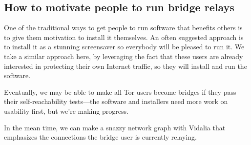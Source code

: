 \documentclass{llncs}
\begin{document}
\subsection{How to motivate people to run bridge relays}
\label{subsec:incentives}

One of the traditional ways to get people to run software that benefits
others is to give them motivation to install it themselves.  An often
suggested approach is to install it as a stunning screensaver so everybody
will be pleased to run it. We take a similar approach here, by leveraging
the fact that these users are already interested in protecting their
own Internet traffic, so they will install and run the software.

Eventually, we may be able to make all Tor users become bridges if they
pass their self-reachability tests---the software and installers need
more work on usability first, but we're making progress.

In the mean time, we can make a snazzy network graph with Vidalia that
emphasizes the connections the bridge user is currently relaying.






\end{document}

